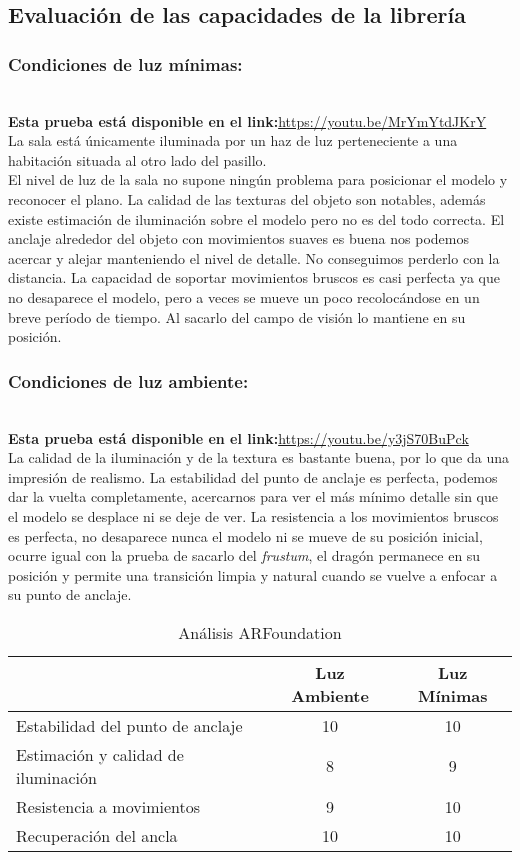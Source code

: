 \subsection{Evaluación de las capacidades de la librería}
\subsubsection{Condiciones de luz mínimas:}\\
\textbf{Esta prueba está disponible en el link:}\url{https://youtu.be/MrYmYtdJKrY}\\

La sala está únicamente iluminada por un haz de luz perteneciente a una habitación situada al otro lado del pasillo.\\

El nivel de luz de la sala no supone ningún problema para posicionar el modelo y reconocer el plano. La calidad de las texturas del objeto son notables, además existe estimación de iluminación sobre el modelo pero no es del todo correcta. El anclaje alrededor del objeto con movimientos suaves es buena nos podemos acercar y alejar manteniendo el nivel de detalle. No conseguimos perderlo con la distancia. La capacidad de soportar movimientos bruscos es casi perfecta ya que no desaparece el modelo, pero a veces se mueve un poco recolocándose en un breve período de tiempo. Al sacarlo del campo de visión lo mantiene en su posición.

\subsubsection{Condiciones de luz ambiente:}\\
\textbf{Esta prueba está disponible en el link:}\url{https://youtu.be/y3jS70BuPck}\\

La calidad de la iluminación y de la textura es bastante buena, por lo que da una impresión de realismo. La estabilidad del punto de anclaje es perfecta, podemos dar la vuelta completamente, acercarnos para ver el más mínimo detalle sin que el modelo se desplace ni se deje de ver. La resistencia a los movimientos bruscos es perfecta, no desaparece nunca el modelo ni se mueve de su posición inicial, ocurre igual con la prueba de sacarlo del \textit{frustum}, el dragón permanece en su posición y permite una transición limpia y natural cuando se vuelve a enfocar a su punto de anclaje.

\begin{table}[H]
    \centering
  \begin{tabular}{|l|c|c|}
    \hline
          & Luz Ambiente & Luz Mínimas \\
         \hline
        Estabilidad del punto de anclaje   &10 &10\\
        \hline
        Estimación y calidad de iluminación  &8 &9 \\
        \hline
        Resistencia a movimientos  &9 &10 \\
        \hline
        Recuperación del ancla  &10 &10 \\
      \hline
    \end{tabular}
    \caption{Análisis ARFoundation}
    \label{tab:ARFoundation}
\end{table}

